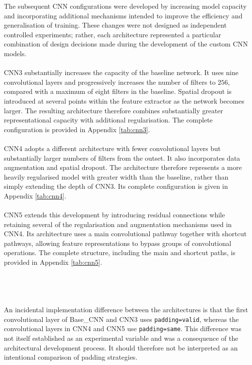 \documentclass[12pt, a4paper]{report}
\begin{document}
				The subsequent CNN configurations were developed by increasing model capacity and incorporating additional mechanisms intended to improve the efficiency and generalisation of training. These changes were not designed as independent controlled experiments; rather, each architecture represented a particular combination of design decisions made during the development of the custom CNN models.\\\\
				CNN3 substantially increases the capacity of the baseline network. It uses nine convolutional layers and progressively increases the number of filters to $256$, compared with a maximum of eight filters in the baseline. Spatial dropout is introduced at several points within the feature extractor as the network becomes larger. The resulting architecture therefore combines substantially greater representational capacity with additional regularisation. The complete configuration is provided in Appendix \ref{tab:cnn3}.\\\\
				CNN4 adopts a different architecture with fewer convolutional layers but substantially larger numbers of filters from the outset. It also incorporates data augmentation and spatial dropout. The architecture therefore represents a more heavily regularised model with greater width than the baseline, rather than simply extending the depth of CNN3. Its complete configuration is given in Appendix \ref{tab:cnn4}.\\\\
				CNN5 extends this development by introducing residual connections while retaining several of the regularisation and augmentation mechanisms used in CNN4. Its architecture uses a main convolutional pathway together with shortcut pathways, allowing feature representations to bypass groups of convolutional operations. The complete structure, including the main and shortcut paths, is provided in Appendix \ref{tab:cnn5}.\\\\\\\\\\
				An incidental implementation difference between the architectures is that the first convolutional layer of Base\_CNN and CNN3 uses \texttt{padding=valid}, whereas the convolutional layers in CNN4 and CNN5 use \texttt{padding=same}. This difference was not itself established as an experimental variable and was a consequence of the architectural development process. It should therefore not be interpreted as an intentional comparison of padding strategies.
				
\end{document}
